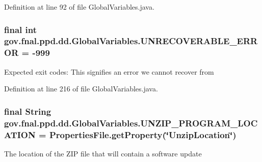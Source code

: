 Definition at line 92 of file Global\-Variables.\-java.

\hypertarget{classgov_1_1fnal_1_1ppd_1_1dd_1_1GlobalVariables_af2d69bd16e463355307ead1135160408}{
\subsubsection[{U\-N\-R\-E\-C\-O\-V\-E\-R\-A\-B\-L\-E\-\_\-\-E\-R\-R\-O\-R}]{\setlength{\rightskip}{0pt plus 5cm}final int gov.\-fnal.\-ppd.\-dd.\-Global\-Variables.\-U\-N\-R\-E\-C\-O\-V\-E\-R\-A\-B\-L\-E\-\_\-\-E\-R\-R\-O\-R = -\/999\hspace{0.3cm}{\ttfamily [static]}}}\label{classgov_1_1fnal_1_1ppd_1_1dd_1_1GlobalVariables_af2d69bd16e463355307ead1135160408}
Expected exit codes\-: This signifies an error we cannot recover from 

Definition at line 216 of file Global\-Variables.\-java.

\hypertarget{classgov_1_1fnal_1_1ppd_1_1dd_1_1GlobalVariables_a3b3484a9eaa4099af2a1ade1fa0f94a5}{
\subsubsection[{U\-N\-Z\-I\-P\-\_\-\-P\-R\-O\-G\-R\-A\-M\-\_\-\-L\-O\-C\-A\-T\-I\-O\-N}]{\setlength{\rightskip}{0pt plus 5cm}final String gov.\-fnal.\-ppd.\-dd.\-Global\-Variables.\-U\-N\-Z\-I\-P\-\_\-\-P\-R\-O\-G\-R\-A\-M\-\_\-\-L\-O\-C\-A\-T\-I\-O\-N = {\bf Properties\-File.\-get\-Property}(\char`\"{}Unzip\-Location\char`\"{})\hspace{0.3cm}{\ttfamily [static]}}}\label{classgov_1_1fnal_1_1ppd_1_1dd_1_1GlobalVariables_a3b3484a9eaa4099af2a1ade1fa0f94a5}
The location of the Z\-I\-P file that will contain a software update 

